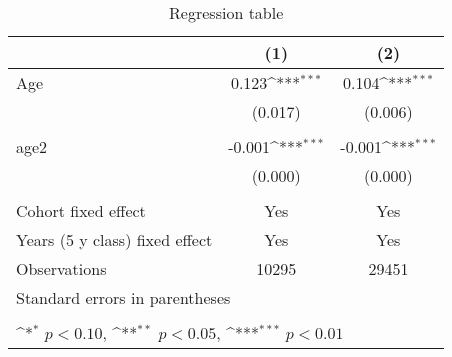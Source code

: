 \begin{table}[htbp]\centering
    \def\sym#1{\ifmmode^{#1}\else\(^{#1}\)\fi}
    \caption{Regression table \label{reg1}}
    \begin{tabular}{l*{2}{c}}
    \hline
                        &\multicolumn{1}{c}{(1)}         &\multicolumn{1}{c}{(2)}         \\
    \hline
    Age                 &       0.123\sym{***}&       0.104\sym{***}\\
                        &     (0.017)         &     (0.006)         \\
    \\
    age2                &      -0.001\sym{***}&      -0.001\sym{***}\\
                        &     (0.000)         &     (0.000)         \\
    \\
    Cohort fixed effect           &       Yes        &       Yes        \\
    Years (5 y class) fixed effect             &       Yes       &       Yes         \\
    \hline
    Observations        &       10295         &       29451         \\
    \hline
    \multicolumn{3}{l}{\footnotesize Standard errors in parentheses}\\
    \multicolumn{3}{l}{\footnotesize }\\
    \multicolumn{3}{l}{\footnotesize \sym{*} \(p<0.10\), \sym{**} \(p<0.05\), \sym{***} \(p<0.01\)}\\
    \end{tabular}
    \end{table}
    